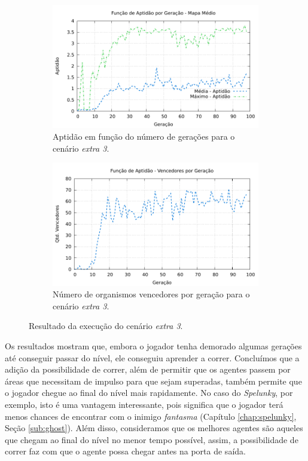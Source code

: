 \begin{figure}[H]
\centering
	\begin{subfigure}[b]{0.45\textwidth}
        \includegraphics[width=\textwidth]{fig/extra3-fitness.pdf}
        \caption{Aptidão em função do número de gerações para o cenário
        \textit{extra 3}.}
	\end{subfigure}
	\begin{subfigure}[b]{0.45\textwidth}
        \includegraphics[width=\textwidth]{fig/extra3-winners.pdf}
        \caption{Número de organismos vencedores por geração para o cenário
        \textit{extra 3}.}
	\end{subfigure}

    \caption{Resultado da execução do cenário \textit{extra 3}.}
	\label{fig:extra3-results}
\end{figure}

Os resultados mostram que, embora o jogador tenha demorado algumas gerações até
conseguir passar do nível, ele conseguiu aprender a correr. Concluímos que a
adição da possibilidade de correr, além de permitir que os agentes passem por
áreas que necessitam de impulso para que sejam superadas, também permite que o
jogador chegue ao final do nível mais rapidamente. No caso do \textit{Spelunky},
por exemplo, isto é uma vantagem interessante, pois significa que o jogador terá
menos chances de encontrar com o inimigo \textit{fantasma} (Capítulo
\ref{chap:spelunky}, Seção \ref{sub:ghost}). Além disso, consideramos que os
melhores agentes são aqueles que chegam ao final do nível no menor tempo
possível, assim, a possibilidade de correr faz com que o agente possa chegar
antes na porta de saída.

